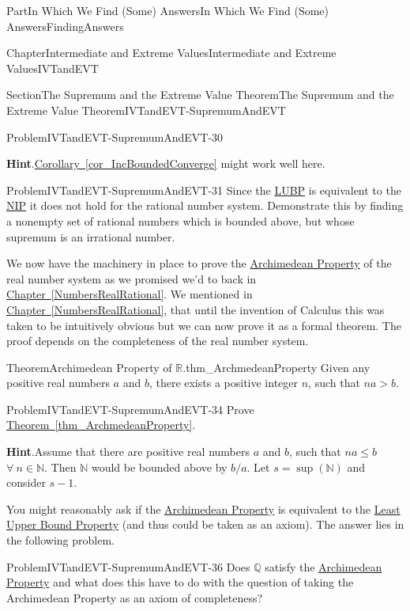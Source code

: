 \documentclass[oneside,10pt,]{book}
\newcommand{\blocktitlefont}{\relax}
\newcommand{\xreffont}{\relax}
\numberwithin{equation}{part}
\newcommand{\RR}{\mathbb {R}}
\newcommand{\QQ}{\mathbb {Q}}
\newcommand{\NN}{\mathbb {N}}
\begin{document}
\begin{partptx}{Part}{In Which We Find (Some) Answers}{}{In Which We Find (Some) Answers}{}{}{FindingAnswers}
\begin{chapterptx}{Chapter}{Intermediate and Extreme Values}{}{Intermediate and Extreme Values}{}{}{IVTandEVT}
\begin{sectionptx}{Section}{The Supremum and the Extreme Value Theorem}{}{The Supremum and the Extreme Value Theorem}{}{}{IVTandEVT-SupremumAndEVT}
\begin{problem}{Problem}{}{IVTandEVT-SupremumAndEVT-30}
\par\smallskip%
\noindent\textbf{\blocktitlefont Hint}.\hypertarget{IVTandEVT-SupremumAndEVT-30-3}{}\quad{}\hyperref[cor_IncBoundedConverge]{Corollary~{\xreffont\ref{cor_IncBoundedConverge}}} might work well here.%
\end{problem}
\begin{problem}{Problem}{}{IVTandEVT-SupremumAndEVT-31}%
Since the \hyperref[thm_LUB]{LUBP} is equivalent to the \hyperref[NIP]{NIP} it does not hold for the rational number system. Demonstrate this by finding a non\textendash{}empty set of rational numbers which is bounded above, but whose supremum is an irrational number.%
\end{problem}
We now have the machinery in place to prove the \hyperref[ArchimedeanProperty]{Archimedean Property} of the real number system as we promised we'd to back in \hyperref[NumbersRealRational]{Chapter~{\xreffont\ref{NumbersRealRational}}}. We mentioned in \hyperref[NumbersRealRational]{Chapter~{\xreffont\ref{NumbersRealRational}}}, that until the invention of Calculus this was taken to be intuitively obvious but we can now prove it as a formal theorem. The proof depends on the completeness of the real number system.%
\begin{theorem}{Theorem}{Archimedean Property of \(\RR\).}{}{thm_ArchmedeanProperty}%
%
Given any positive real numbers \(a\) and \(b\), there exists a positive integer \(n\), such that \(na>b\).%
\end{theorem}
\begin{problem}{Problem}{}{IVTandEVT-SupremumAndEVT-34}%
Prove \hyperref[thm_ArchmedeanProperty]{Theorem~{\xreffont\ref{thm_ArchmedeanProperty}}}.%
\par\smallskip%
\noindent\textbf{\blocktitlefont Hint}.\hypertarget{IVTandEVT-SupremumAndEVT-34-4}{}\quad{}Assume that there are positive real numbers \(a\) and \(b\), such that \(na\le b\) \(\forall\  n\in \NN\). Then \(\NN\) would be bounded above by \(b/a\). Let \(s=\sup(\NN)\) and consider \(s-1\).%
\end{problem}
You might reasonably ask if the \hyperref[thm_ArchmedeanProperty]{Archimedean Property} is equivalent to the \hyperref[thm_LUB]{Least Upper Bound Property} (and thus could be taken as an axiom).  The answer lies in the following problem.%
\begin{problem}{Problem}{}{IVTandEVT-SupremumAndEVT-36}%
Does \(\QQ\) satisfy the \hyperref[thm_ArchmedeanProperty]{Archimedean Property} and what does this have to do with the question of taking the Archimedean Property as an axiom of completeness?%

\end{problem}
\end{sectionptx}
\end{chapterptx}
\end{partptx}
\end{document}
